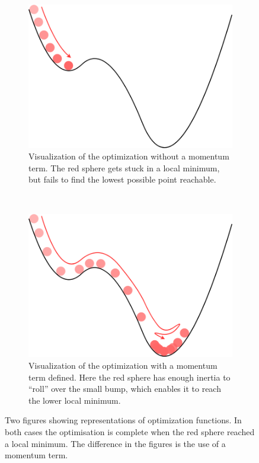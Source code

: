 \begin{figure}[h!]
	\centering
	\begin{subfigure}[t]{0.5\textwidth}
		\centering
		\includegraphics[width=\textwidth]{img/implementation_neuralNetwork_modificationsToTheNN_a.png}
		\caption{Visualization of the optimization without a momentum term. The red sphere gets stuck in a local minimum, but fails to find the lowest possible point reachable.}
		\label{pic:implementation_neuralNetwork_modificationsToTheNN_a}
	\end{subfigure}%
	~
	\begin{subfigure}[t]{0.5\textwidth}
		\centering
		\includegraphics[width=\textwidth]{img/implementation_neuralNetwork_modificationsToTheNN_b.png}
		\caption{Visualization of the optimization with a momentum term defined. Here the red sphere has enough inertia to ``roll'' over the small bump, which enables it to reach the lower local minimum.}
		\label{pic:implementation_neuralNetwork_modificationsToTheNN_b}
	\end{subfigure}
	\caption{Two figures showing representations of optimization functions. In both cases the optimisation is complete when the red sphere reached a local minimum. The difference in the figures is the use of a momentum term.}
	\label{pic:implementation_neuralNetwork_modificationsToTheNN}
\end{figure}

